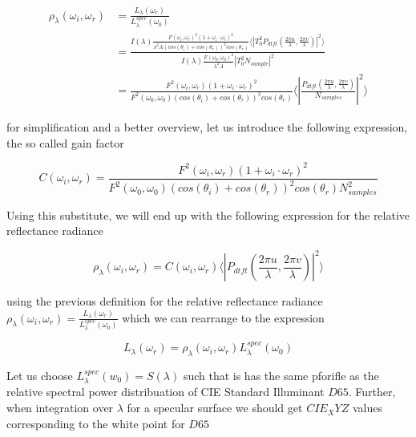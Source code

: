 \begin{align*}
\rho_\lambda(\omega_i,\omega_r)
& = \frac{L_\lambda(\omega_r)}{L_\lambda^{spec}(\omega_0)} \\
& = \frac{I(\lambda) \frac{F(\omega_i, \omega_r)^2 (1 + \omega_i \cdot \omega_r)^2}{\lambda^2 A (cos(\theta_i)+cos(\theta_r))^2 cos(\theta_r)} \langle \left|T_0^2 P_{dtft}(\frac{2\pi u}{\lambda}, \frac{2\pi v}{\lambda}) \right|^2\rangle}{I(\lambda) \frac{F(\omega_0, \omega_0)^2}{\lambda^2 A}\left| T_0^2 N_{sample} \right|^2 } \\
& = \frac{F^2(\omega_i,\omega_r)(1 + \omega_i \cdot \omega_r)^2}{F^2(\omega_0,\omega_0)(cos(\theta_i)+cos(\theta_r))^2 cos(\theta_r)} \langle \left|\frac{P_{dtft}(\frac{2\pi u}{\lambda}, \frac{2\pi v}{\lambda})}{N_{samples}}\right|^2\rangle
\end{align*}

for simplification and a better overview, let us introduce the following expression, the so called gain factor

\begin{equation} \label{eq:cfact}
    C(\omega_i,\omega_r) = \frac{F^2(\omega_i,\omega_r)(1 + \omega_i \cdot \omega_r)^2}{F^2(\omega_0,\omega_0)(cos(\theta_i)+cos(\theta_r))^2 cos(\theta_r) N_{samples}^2}
\end{equation}

Using this substitute, we will end up with the following expression for the relative reflectance radiance

\begin{equation}
\rho_\lambda(\omega_i,\omega_r) =  C(\omega_i,\omega_r) \langle \left|P_{dtft}(\frac{2\pi u}{\lambda}, \frac{2\pi v}{\lambda})\right|^2\rangle
\end{equation}

using the previous definition for the relative reflectance radiance $\rho_\lambda(\omega_i,\omega_r) = \frac{L_\lambda(\omega_r)}{L_\lambda^{spec}(\omega_0)}$ which we can rearrange to the expression 

\begin{equation}
L_\lambda(\omega_r) = \rho_\lambda(\omega_i,\omega_r)L_\lambda^{spec}(\omega_0)
\end{equation}

Let us choose $L_\lambda^{spec}(w_0) = S(\lambda)$ such that is has the same pforifle as the relative spectral power distribuation of CIE Standard Illuminant $D65$. Further, when integration over $\lambda$ for a specular surface we should get $CIE_XYZ$ values corresponding to the white point for $D65$ 

